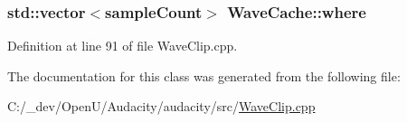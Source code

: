 \subsubsection[{\texorpdfstring{where}{where}}]{\setlength{\rightskip}{0pt plus 5cm}std\+::vector$<${\bf sample\+Count}$>$ Wave\+Cache\+::where}\hypertarget{class_wave_cache_af7df2954eebfc2644b127954f320066d}{}\label{class_wave_cache_af7df2954eebfc2644b127954f320066d}


Definition at line 91 of file Wave\+Clip.\+cpp.



The documentation for this class was generated from the following file\+:\begin{DoxyCompactItemize}
\item 
C\+:/\+\_\+dev/\+Open\+U/\+Audacity/audacity/src/\hyperlink{_wave_clip_8cpp}{Wave\+Clip.\+cpp}\end{DoxyCompactItemize}
